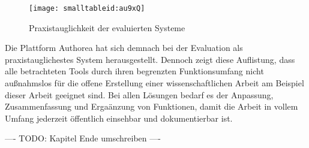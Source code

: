 \begin{itemize}
\end{itemize}

\begin{figure}[h!]
\texttt{[image: smalltableid:au9xQ]}
\caption{Praxistauglichkeit der evaluierten Systeme}
\end{figure}

Die Plattform Authorea hat sich demnach bei der Evaluation als praxistauglichestes System herausgestellt. Dennoch zeigt diese Auflistung, dass alle betrachteten Tools durch ihren begrenzten Funktionsumfang nicht außnahmslos für die offene Erstellung einer wissenschaftlichen Arbeit am Beispiel dieser Arbeit geeignet sind. Bei allen Lösungen bedarf es der Anpassung, Zusammenfassung und Ergaänzung von Funktionen, damit die Arbeit in vollem Umfang jederzeit öffentlich einsehbar und dokumentierbar ist.

---- TODO: Kapitel Ende umschreiben ----
